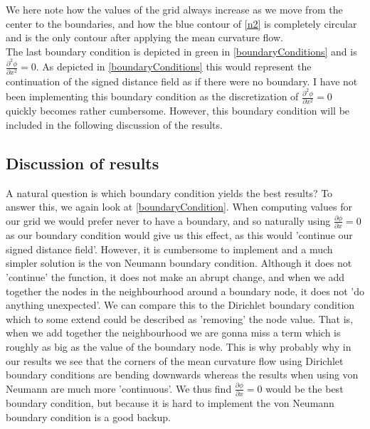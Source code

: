 We here note how the values of the grid always increase as we move from the center to the boundaries, and how the blue contour of \autoref{n2} is completely circular and is the only contour after applying the mean curvature flow.\\
The last boundary condition is depicted in green in \autoref{boundaryConditions} and is $\frac{\partial^2 \phi}{\partial x^2} = 0$. As depicted in \autoref{boundaryConditions} this would represent the continuation of the signed distance field as if there were no boundary. I have not been implementing this boundary condition as the discretization of $\frac{\partial^2 \phi}{\partial x^2} = 0$ quickly becomes rather cumbersome. However, this boundary condition will be included in the following discussion of the results.

\subsection{Discussion of results}
A natural question is which boundary condition yields the best results? To answer this, we again look at \autoref{boundaryCondition}. When computing values for our grid we would prefer never to have a boundary, and so naturally using $\frac{\partial \phi}{\partial x} = 0$ as our boundary condition would give us this effect, as this would 'continue our signed distance field'. However, it is cumbersome to implement and a much simpler solution is the von Neumann boundary condition. Although it does not 'continue' the function, it does not make an abrupt change, and when we add together the nodes in the neighbourhood around a boundary node, it does not 'do anything unexpected'. We can compare this to the Dirichlet boundary condition which to some extend could be described as 'removing' the node value. That is, when we add together the neighbourhood we are gonna miss a term which is roughly as big as the value of the boundary node. This is why probably why in our results we see that the corners of the mean curvature flow using Dirichlet boundary conditions are bending downwards whereas the results when using von Neumann are much more 'continuous'. We thus find $\frac{\partial \phi}{\partial x} = 0$ would be the best boundary condition, but because it is hard to implement the von Neumann boundary condition is a good backup.